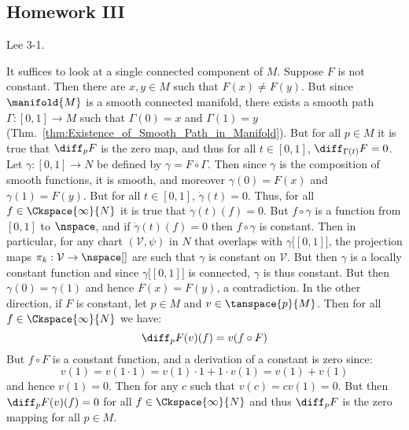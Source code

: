 \documentclass{article}                                                        %
\begin{document}
        \subsection{Homework III}
            \begin{problem}
                Lee 3-1.
            \end{problem}
            \begin{solution}
                It suffices to look at a single connected component of $M$.
                Suppose $F$ is not constant. Then there are $x,y\in{M}$ such
                that $F(x)\ne{F}(y)$. But since $\manifold{M}$ is a smooth
                connected manifold, there exists a smooth path
                $\Gamma:[0,1]\rightarrow{M}$ such that $\Gamma(0)=x$ and
                $\Gamma(1)=y$
                (Thm.~\ref{thm:Existence_of_Smooth_Path_in_Manifold}). But for
                all $p\in{M}$ it is true that $\diff_{p}F$ is the zero map, and
                thus for all $t\in[0,1]$, $\diff_{\Gamma(t)}F=0$. Let
                $\gamma:[0,1]\rightarrow{N}$ be defined by
                $\gamma=F\circ\Gamma$. Then since $\gamma$ is the composition of
                smooth functions, it is smooth, and moreover $\gamma(0)=F(x)$
                and $\gamma(1)=F(y)$. But for all $t\in[0,1]$,
                $\dot{\gamma}(t)=0$. Thus, for all $f\in\Ckspace{\infty}{N}$ it
                is true that $\dot{\gamma}(t)(f)=0$. But $f\circ\gamma$ is a
                function from $[0,1]$ to $\nspace$, and if
                $\dot{\gamma}(t)(f)=0$ then $f\circ\gamma$ is constant. Then in
                particular, for any chart $(\mathcal{V},\psi)$ in $N$ that
                overlaps with $\gamma\big[[0,1]\big]$, the projection maps
                $\pi_{k}:\mathcal{V}\rightarrow\nspace[]$ are such that $\gamma$
                is constant on $\mathcal{V}$. But then $\gamma$ is a locally
                constant function and since $\gamma\big[[0,1]\big]$ is
                connected, $\gamma$ is thus constant. But then
                $\gamma(0)=\gamma(1)$ and hence $F(x)=F(y)$, a contradiction. In
                the other direction, if $F$ is constant, let $p\in{M}$ and
                $v\in\tanspace{p}{M}$. Then for all
                $f\in\Ckspace{\infty}{N}$ we have:
                \begin{equation}
                    \diff_{p}F(v)(f)=v(f\circ{F})
                \end{equation}
                But $f\circ{F}$ is a constant function, and a derivation of a
                constant is zero since:
                \begin{equation}
                    v(1)=v(1\cdot{1})=v(1)\cdot{1}+1\cdot{v}(1)=v(1)+v(1)
                \end{equation}
                and hence $v(1)=0$. Then for any $c$ such that $v(c)=cv(1)=0$.
                But then $\diff_{p}F(v)(f)=0$ for all $f\in\Ckspace{\infty}{N}$
                and thus $\diff_{p}F$ is the zero mapping for all $p\in{M}$.
            \end{solution}
\end{document}
